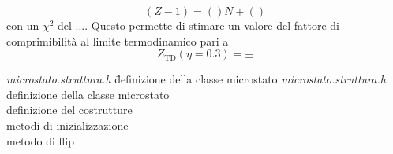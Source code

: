 \documentclass[11pt]{article}
\theoremstyle{plain}
\theoremstyle{remark}
\begin{document}
\begin{displaymath}
 (Z-1) = ()N + ( )
\end{displaymath}
con un $\chi^2$ del ....
Questo permette di stimare un valore del fattore di comprimibilità al limite termodinamico pari a 
\begin{displaymath}
Z_{\textrm{TD}} (\eta = 0.3) = \pm
\end{displaymath}



		\begin{tabbing}
		\emph{microstato.struttura.h} \= definizione della classe microstato \kill
		\emph{microstato.struttura.h} \>\footnotesize definizione della classe microstato \\
		  \>\footnotesize  definizione del costrutture \\
		  \>\footnotesize metodi di inizializzazione  \\
		  \>\footnotesize metodo di flip \\
		\end{tabbing}


\listoffigures



\end{document}
